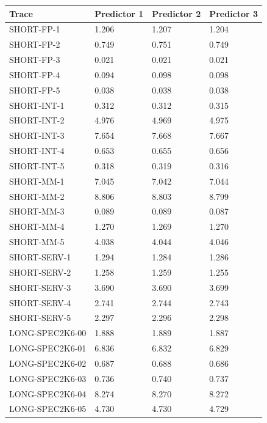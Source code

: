 \documentclass{article}
\begin{document}
\begin{table}[h]
    \centering
    \begin{tabular}{llll}
        \toprule
        \textbf{Trace} & \textbf{Predictor 1} & \textbf{Predictor 2} & \textbf{Predictor 3} \\
        \midrule
        SHORT-FP-1  & 1.206 & 1.207 & 1.204 \\
        SHORT-FP-2  & 0.749 & 0.751 & 0.749 \\
        SHORT-FP-3  & 0.021 & 0.021 & 0.021 \\
        SHORT-FP-4  & 0.094 & 0.098 & 0.098 \\
        SHORT-FP-5  & 0.038 & 0.038 & 0.038 \\
        SHORT-INT-1  & 0.312 & 0.312 & 0.315 \\
        SHORT-INT-2  & 4.976 & 4.969 & 4.975 \\
        SHORT-INT-3  & 7.654 & 7.668 & 7.667 \\
        SHORT-INT-4  & 0.653 & 0.655 & 0.656 \\
        SHORT-INT-5  & 0.318 & 0.319 & 0.316 \\
        SHORT-MM-1  & 7.045 & 7.042 & 7.044 \\
        SHORT-MM-2  & 8.806 & 8.803 & 8.799 \\
        SHORT-MM-3  & 0.089 & 0.089 & 0.087 \\
        SHORT-MM-4  & 1.270 & 1.269 & 1.270 \\
        SHORT-MM-5  & 4.038 & 4.044 & 4.046 \\
        SHORT-SERV-1  & 1.294 & 1.284 & 1.286 \\
        SHORT-SERV-2  & 1.258 & 1.259 & 1.255 \\
        SHORT-SERV-3  & 3.690 & 3.690 & 3.699 \\
        SHORT-SERV-4  & 2.741 & 2.744 & 2.743 \\
        SHORT-SERV-5  & 2.297 & 2.296 & 2.298 \\
        LONG-SPEC2K6-00  & 1.888 & 1.889 & 1.887 \\
        LONG-SPEC2K6-01  & 6.836 & 6.832 & 6.829 \\
        LONG-SPEC2K6-02  & 0.687 & 0.688 & 0.686 \\
        LONG-SPEC2K6-03  & 0.736 & 0.740 & 0.737 \\
        LONG-SPEC2K6-04  & 8.274 & 8.270 & 8.272 \\
        LONG-SPEC2K6-05  & 4.730 & 4.730 & 4.729 \\

\end{tabular}
\end{table}
\end{document}
